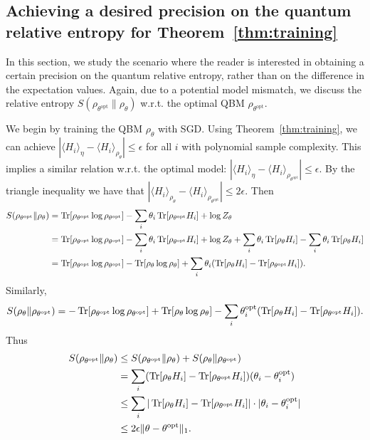 \documentclass[
    aps,
    prx,
    onecolumn
]{revtex4-2}
\begin{document}
\subsection{Achieving a desired precision on the quantum relative entropy for Theorem~\ref{thm:training}}
\label{app:relentprec}

In this section, we study the scenario where the reader is interested in obtaining a certain precision on the quantum relative entropy, rather than on the difference in the expectation values. Again, due to a potential model mismatch, we discuss the relative entropy $S(\rho_{\theta^\mathrm{opt}} \| \rho_{\theta})$ w.r.t. the optimal QBM $\rho_{\theta^\mathrm{opt}}$.

We begin by training the QBM $\rho_{\theta}$ with SGD. Using Theorem~\ref{thm:training}, we can achieve $|\langle H_{i}\rangle_\eta -\langle H_{i} \rangle_{\rho_\theta} | \leq \epsilon$ for all $i$ with polynomial sample complexity. This implies a similar relation w.r.t. the optimal model: $| \langle H_{i}\rangle_\eta -\langle H_{i} \rangle_{\rho_{\theta^\mathrm{opt}}} | \leq \epsilon$. By the triangle inequality we have that $| \langle H_{i}\rangle_{\rho_\theta} - \langle H_{i} \rangle_{\rho_{\theta^\mathrm{opt}}} | \leq 2\epsilon$.
Then
\begin{align}
\begin{split}
S(\rho_{\theta^\mathrm{opt}} \| \rho_\theta) &=\Tr[\rho_{\theta^\mathrm{opt}} \log \rho_{\theta^\mathrm{opt}}] - \sum_i \theta_i \Tr[\rho_{\theta^\mathrm{opt}} H_i] + \log{Z_{\theta}} \\
&= \Tr[\rho_{\theta^\mathrm{opt}} \log \rho_{\theta^\mathrm{opt}}] - \sum_i \theta_i \Tr[\rho_{\theta^\mathrm{opt}} H_i] + \log Z_\theta + \sum_i \theta_i \Tr[\rho_{\theta} H_i] -  \sum_i \theta_i \Tr[\rho_{\theta} H_i] \\
&= \Tr[\rho_{\theta^\mathrm{opt}} \log \rho_{\theta^\mathrm{opt}}] - \Tr[\rho_{\theta} \log \rho_{\theta}] + \sum_i \theta_i ( \Tr[\rho_{\theta} H_i] - \Tr[\rho_{\theta^\mathrm{opt}} H_i] ).
\end{split}
\end{align}
Similarly,
\begin{align}
S(\rho_{\theta} \| \rho_{\theta^\mathrm{opt}}) =  - \Tr[\rho_{\theta^\mathrm{opt}} \log \rho_{\theta^\mathrm{opt}}] + \Tr[\rho_{\theta} \log \rho_{\theta}] - \sum_i \theta^\textrm{opt}_i ( \Tr[\rho_{\theta} H_i] - \Tr[\rho_{\theta^\mathrm{opt}} H_i] ). 
\end{align}
Thus
\begin{align}
\begin{split}
\label{eq:up_bound_for_S}
S(\rho_{\theta^\mathrm{opt}} \| \rho_\theta) &\leq S(\rho_{\theta^\mathrm{opt}} \| \rho_\theta) + S(\rho_{\theta} \| \rho_{\theta^\mathrm{opt}}) \\
&= \sum_i ( \Tr[\rho_{\theta} H_i] - \Tr[\rho_{\theta^\mathrm{opt}} H_i] ) ( \theta_i - \theta^\textrm{opt}_i) \\
&\leq \sum_i | \Tr[\rho_{\theta} H_i] - \Tr[\rho_{\theta^\mathrm{opt}} H_i] | \cdot | \theta_i - \theta^\textrm{opt}_i | \\
&\leq 2 \epsilon \| \theta - \theta^\textrm{opt} \|_1 .
\end{split}
\end{align}
\end{document}
